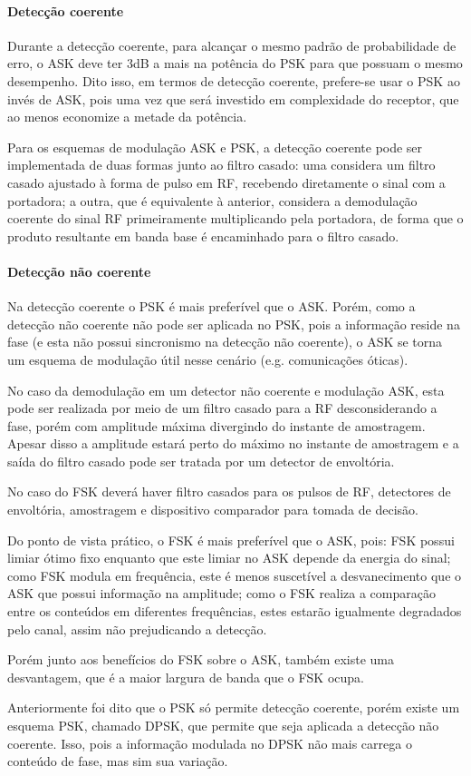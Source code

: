 

\paragraph{Detecção coerente}

Durante a detecção coerente, para alcançar o mesmo padrão de probabilidade de erro, o ASK deve ter 3dB a mais na potência do PSK para que possuam o mesmo desempenho. Dito isso, em termos de detecção coerente, prefere-se usar o PSK ao invés de ASK, pois uma vez que será investido em complexidade do receptor, que ao menos economize a metade da potência.

Para os esquemas de modulação ASK e PSK, a detecção coerente pode ser implementada de duas formas junto ao filtro casado: uma considera um filtro casado ajustado à forma de pulso em RF, recebendo diretamente o sinal com a portadora; a outra, que é equivalente à anterior, considera a demodulação coerente do sinal RF primeiramente multiplicando pela portadora, de forma que o produto resultante em banda base é encaminhado para o filtro casado.

\paragraph{Detecção não coerente}

Na detecção coerente o PSK é mais preferível que o ASK. Porém, como a detecção não coerente não pode ser aplicada no PSK, pois a informação reside na fase (e esta não possui sincronismo na detecção não coerente), o ASK se torna um esquema de modulação útil nesse cenário (e.g. comunicações óticas).

No caso da demodulação em um detector não coerente e modulação ASK, esta pode ser realizada por meio de um filtro casado para a RF desconsiderando a fase, porém com amplitude máxima divergindo do instante de amostragem. Apesar disso a amplitude estará perto do máximo no instante de amostragem e a saída do filtro casado pode ser tratada por um detector de envoltória.

No caso do FSK deverá haver filtro casados para os pulsos de RF, detectores de envoltória, amostragem e dispositivo comparador para tomada de decisão.

Do ponto de vista prático, o FSK é mais preferível que o ASK, pois: FSK possui limiar ótimo fixo enquanto que este limiar  no ASK depende da energia do sinal; como FSK modula em frequência, este é menos suscetível a desvanecimento que o ASK que possui informação na amplitude; como o FSK realiza a comparação entre os conteúdos em diferentes frequências, estes estarão igualmente degradados pelo canal, assim não prejudicando a detecção.

Porém junto aos benefícios do FSK sobre o ASK, também existe uma desvantagem, que é a maior largura de banda que o FSK ocupa. 

Anteriormente foi dito que o PSK só permite detecção coerente, porém existe um esquema PSK, chamado DPSK, que permite que seja aplicada a detecção não coerente. Isso, pois a informação modulada no DPSK não mais carrega o conteúdo de fase, mas sim sua variação.